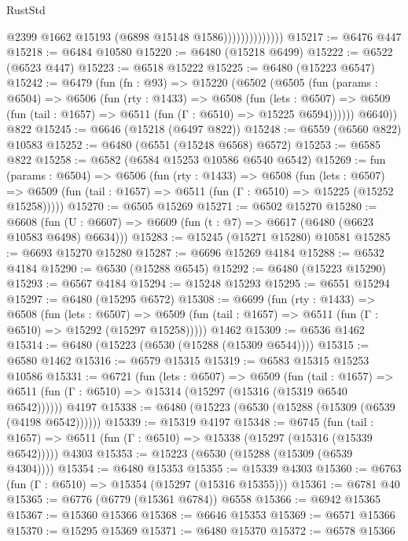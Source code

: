 \begin{lexlean}{RustStd}
\begin{coremodule}
                              @2399
                              @1662
                              @15193
                              (@6898 @15148 @1586))))))))))))))
@15217 := @6476 @447
@15218 := @6484 @10580
@15220 := @6480 (@15218 @6499)
@15222 := @6522 (@6523 @447)
@15223 := @6518 @15222
@15225 := @6480 (@15223 @6547)
@15242 := @6479
    (fun (fn : @93) =>
    @15220
      (@6502
        (@6505
          (fun (params : @6504) =>
          @6506
            (fun (rty : @1433) =>
            @6508
              (fun (lets : @6507) =>
              @6509 (fun (tail : @1657) => @6511 (fun (Γ : @6510) => @15225 @6594))))))
        @6640))
    @822
@15245 := @6646 (@15218 (@6497 @822))
@15248 := @6559 (@6560 @822) @10583
@15252 := @6480 (@6551 (@15248 @6568) @6572)
@15253 := @6585 @822
@15258 := @6582 (@6584 @15253 @10586 @6540 @6542)
@15269 := fun (params : @6504) =>
  @6506
    (fun (rty : @1433) =>
    @6508
      (fun (lets : @6507) =>
      @6509 (fun (tail : @1657) => @6511 (fun (Γ : @6510) => @15225 (@15252 @15258)))))
@15270 := @6505 @15269
@15271 := @6502 @15270
@15280 := @6608
    (fun (U : @6607) => @6609 (fun (t : @7) => @6617 (@6480 (@6623 @10583 @6498) @6634)))
@15283 := @15245 (@15271 @15280) @10581
@15285 := @6693 @15270 @15280
@15287 := @6696 @15269 @4184
@15288 := @6532 @4184
@15290 := @6530 (@15288 @6545)
@15292 := @6480 (@15223 @15290)
@15293 := @6567 @4184
@15294 := @15248 @15293
@15295 := @6551 @15294
@15297 := @6480 (@15295 @6572)
@15308 := @6699
    (fun (rty : @1433) =>
    @6508
      (fun (lets : @6507) =>
      @6509 (fun (tail : @1657) => @6511 (fun (Γ : @6510) => @15292 (@15297 @15258)))))
    @1462
@15309 := @6536 @1462
@15314 := @6480 (@15223 (@6530 (@15288 (@15309 @6544))))
@15315 := @6580 @1462
@15316 := @6579 @15315
@15319 := @6583 @15315 @15253 @10586
@15331 := @6721
    (fun (lets : @6507) =>
    @6509
      (fun (tail : @1657) =>
      @6511 (fun (Γ : @6510) => @15314 (@15297 (@15316 (@15319 @6540 @6542))))))
    @4197
@15338 := @6480 (@15223 (@6530 (@15288 (@15309 (@6539 (@4198 @6542))))))
@15339 := @15319 @4197
@15348 := @6745
    (fun (tail : @1657) => @6511 (fun (Γ : @6510) => @15338 (@15297 (@15316 (@15339 @6542)))))
    @4303
@15353 := @15223 (@6530 (@15288 (@15309 (@6539 @4304))))
@15354 := @6480 @15353
@15355 := @15339 @4303
@15360 := @6763 (fun (Γ : @6510) => @15354 (@15297 (@15316 @15355)))
@15361 := @6781 @40
@15365 := @6776 (@6779 (@15361 @6784)) @6558
@15366 := @6942 @15365
@15367 := @15360 @15366
@15368 := @6646 @15353
@15369 := @6571 @15366
@15370 := @15295 @15369
@15371 := @6480 @15370
@15372 := @6578 @15366

\end{coremodule}
\end{lexlean}
